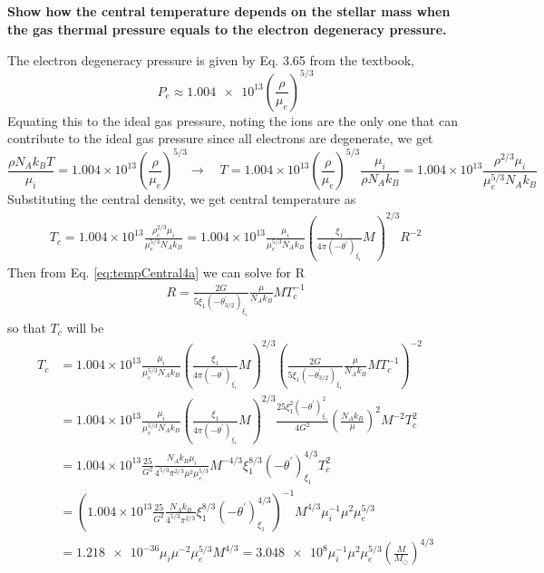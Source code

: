 \subsection{}
\textbf{Show how the central temperature depends on the stellar mass when the gas thermal pressure equals to the electron degeneracy pressure.}

The electron degeneracy pressure is given by Eq. 3.65 from the textbook,
\begin{equation*}
    P_e \approx \num{1.004e13}\left(\frac{\rho}{\mu_e}\right)^{5/3}
\end{equation*}
Equating this to the ideal gas pressure, noting the ions are the only one that can contribute to the ideal gas pressure since all electrons are degenerate, we get
\begin{equation*}
    \frac{\rho N_A k_B T}{\mu_i} 
    = 1.004\times 10^{13}\left(\frac{\rho}{\mu_e}\right)^{5/3} \rightarrow\quad 
    T = 1.004\times 10^{13}\left(\frac{\rho}{\mu_e}\right)^{5/3}\frac{\mu_i}{\rho N_A k_B} 
    = 1.004\times 10^{13}\frac{\rho^{2/3}\mu_i}{\mu_e^{5/3} N_A k_B}
\end{equation*}
Substituting the central density, we get central temperature as 
\begin{align*}
    T_c = 1.004\times 10^{13}\frac{\rho_c^{2/3}\mu_i}{\mu_e^{5/3} N_A k_B}
    = 1.004\times 10^{13}\frac{\mu_i}{\mu_e^{5/3} N_A k_B} \left(\frac{\xi_1}{4\pi(-\theta^\prime)_{\xi_1}}M\right)^{2/3} R^{-2}
\end{align*}
Then from Eq. \ref{eq:tempCentral4a} we can solve for R
\begin{align*}
    R = \frac{2G}{5\xi_1(-\theta^\prime_{3/2})_{\xi_1}}\frac{\mu}{N_Ak_B}M T_c^{-1}
\end{align*}
so that $T_c$ will be
\begin{align*}
    T_c &= 1.004\times 10^{13}\frac{\mu_i}{\mu_e^{5/3} N_A k_B} \left(\frac{\xi_1}{4\pi(-\theta^\prime)_{\xi_1}}M\right)^{2/3}\left(\frac{2G}{5\xi_1(-\theta^\prime_{3/2})_{\xi_1}}\frac{\mu}{N_Ak_B}M T_c^{-1}\right)^{-2}\\
    &= 1.004\times 10^{13}\frac{\mu_i}{\mu_e^{5/3} N_A k_B} \left(\frac{\xi_1}{4\pi(-\theta^\prime)_{\xi_1}}M\right)^{2/3}\frac{25\xi_1^2(-\theta^\prime)^2_{\xi_1}}{4G^2}\left(\frac{N_Ak_B}{\mu}\right)^2M^{-2}T_c^{2}\\
    &= 1.004\times 10^{13} \frac{25}{G^2}\frac{N_Ak_B\mu_i}{4^{5/3}\pi^{2/3} \mu^2\mu_e^{5/3}}M^{-4/3}\xi^{8/3}_1(-\theta^\prime)^{4/3}_{\xi_1}T_c^2 \\
    &= \left(1.004\times 10^{13} \frac{25}{G^2}\frac{N_Ak_B}{4^{5/3}\pi^{2/3}} \xi^{8/3}_1(-\theta^\prime)^{4/3}_{\xi_1}\right)^{-1}M^{4/3}\mu_i^{-1}\mu^{2}\mu_e^{5/3}\\
    &= \num{1.218e-36} \mu_i\mu^{-2}\mu_e^{5/3} M^{4/3} 
    = \num{3.048e8}\mu_i^{-1}\mu^{2}\mu_e^{5/3} \left(\frac{M}{M_\odot}\right)^{4/3}
\end{align*}

